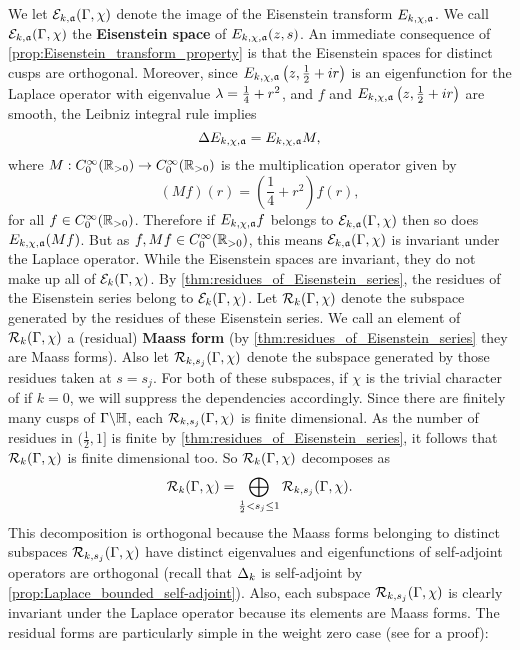     We let $\mathcal{E}_{k,\mathfrak{a}}(\Gamma,\chi)$ denote the image of the Eisenstein transform $E_{k,\chi,\mathfrak{a}}$. We call $\mathcal{E}_{k,\mathfrak{a}}(\Gamma,\chi)$ the \textbf{Eisenstein space} of $E_{k,\chi,\mathfrak{a}}(z,s)$. An immediate consequence of \cref{prop:Eisenstein_transform_property} is that the Eisenstein spaces for distinct cusps are orthogonal. Moreover, since $E_{k,\chi,\mathfrak{a}}\left(z,\frac{1}{2}+ir\right)$ is an eigenfunction for the Laplace operator with eigenvalue $\lambda = \frac{1}{4}+r^{2}$, and $f$ and $E_{k,\chi,\mathfrak{a}}\left(z,\frac{1}{2}+ir\right)$ are smooth, the Leibniz integral rule implies
    \[
      \Delta E_{k,\chi,\mathfrak{a}}= E_{k,\chi,\mathfrak{a}}M,
    \]
    where $M:C_{0}^{\infty}(\mathbb{R}_{> 0}) \to C_{0}^{\infty}(\mathbb{R}_{> 0})$ is the multiplication operator given by
    \[
      (Mf)(r) = \left(\frac{1}{4}+r^{2}\right)f(r),
    \]
    for all $f \in C_{0}^{\infty}(\mathbb{R}_{> 0})$. Therefore if $E_{k,\chi,\mathfrak{a}}f$ belongs to $\mathcal{E}_{k,\mathfrak{a}}(\Gamma,\chi)$ then so does $E_{k,\chi,\mathfrak{a}}(Mf)$. But as $f,Mf \in C_{0}^{\infty}(\mathbb{R}_{> 0})$, this means $\mathcal{E}_{k,\mathfrak{a}}(\Gamma,\chi)$ is invariant under the Laplace operator. While the Eisenstein spaces are invariant, they do not make up all of $\mathcal{E}_{k}(\Gamma,\chi)$. By \cref{thm:residues_of_Eisenstein_series}, the residues of the Eisenstein series belong to $\mathcal{E}_{k}(\Gamma,\chi)$. Let $\mathcal{R}_{k}(\Gamma,\chi)$ denote the subspace generated by the residues of these Eisenstein series. We call an element of $\mathcal{R}_{k}(\Gamma,\chi)$ a (residual) \textbf{Maass form} (by \cref{thm:residues_of_Eisenstein_series} they are Maass forms). Also let $\mathcal{R}_{k,s_{j}}(\Gamma,\chi)$ denote the subspace generated by those residues taken at $s = s_{j}$. For both of these subspaces, if $\chi$ is the trivial character of if $k = 0$, we will suppress the dependencies accordingly. Since there are finitely many cusps of $\Gamma\backslash\mathbb{H}$, each $\mathcal{R}_{k,s_{j}}(\Gamma,\chi)$ is finite dimensional. As the number of residues in $(\frac{1}{2},1]$ is finite by \cref{thm:residues_of_Eisenstein_series}, it follows that $\mathcal{R}_{k}(\Gamma,\chi)$ is finite dimensional too. So $\mathcal{R}_{k}(\Gamma,\chi)$ decomposes as
    \[
      \mathcal{R}_{k}(\Gamma,\chi) = \bigoplus_{\frac{1}{2} < s_{j} \le 1}\mathcal{R}_{k,s_{j}}(\Gamma,\chi).
    \]
    This decomposition is orthogonal because the Maass forms belonging to distinct subspaces $\mathcal{R}_{k,s_{j}}(\Gamma,\chi)$ have distinct eigenvalues and eigenfunctions of self-adjoint operators are orthogonal (recall that $\Delta_{k}$ is self-adjoint by \cref{prop:Laplace_bounded_self-adjoint}). Also, each subspace $\mathcal{R}_{k,s_{j}}(\Gamma,\chi)$ is clearly invariant under the Laplace operator because its elements are Maass forms. The residual forms are particularly simple in the weight zero case (see \cite{iwaniec2002spectral} for a proof):

